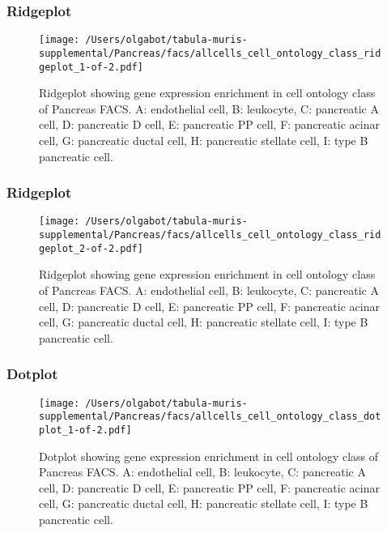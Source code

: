 \clearpage
\clearpage
\subsubsection{Ridgeplot}
\begin{figure}[h]
\centering
\texttt{[image: /Users/olgabot/tabula-muris-supplemental/Pancreas/facs/allcells\_cell\_ontology\_class\_ridgeplot\_1-of-2.pdf]}

\caption{ Ridgeplot  showing gene expression enrichment in cell ontology class of Pancreas FACS. A: endothelial cell, B: leukocyte, C: pancreatic A cell, D: pancreatic D cell, E: pancreatic PP cell, F: pancreatic acinar cell, G: pancreatic ductal cell, H: pancreatic stellate cell, I: type B pancreatic cell.}
\end{figure}


\clearpage
\clearpage
\subsubsection{Ridgeplot}
\begin{figure}[h]
\centering
\texttt{[image: /Users/olgabot/tabula-muris-supplemental/Pancreas/facs/allcells\_cell\_ontology\_class\_ridgeplot\_2-of-2.pdf]}

\caption{ Ridgeplot  showing gene expression enrichment in cell ontology class of Pancreas FACS. A: endothelial cell, B: leukocyte, C: pancreatic A cell, D: pancreatic D cell, E: pancreatic PP cell, F: pancreatic acinar cell, G: pancreatic ductal cell, H: pancreatic stellate cell, I: type B pancreatic cell.}
\end{figure}


\clearpage
\clearpage
\subsubsection{Dotplot}
\begin{figure}[h]
\centering
\texttt{[image: /Users/olgabot/tabula-muris-supplemental/Pancreas/facs/allcells\_cell\_ontology\_class\_dotplot\_1-of-2.pdf]}

\caption{ Dotplot  showing gene expression enrichment in cell ontology class of Pancreas FACS. A: endothelial cell, B: leukocyte, C: pancreatic A cell, D: pancreatic D cell, E: pancreatic PP cell, F: pancreatic acinar cell, G: pancreatic ductal cell, H: pancreatic stellate cell, I: type B pancreatic cell.}
\end{figure}


